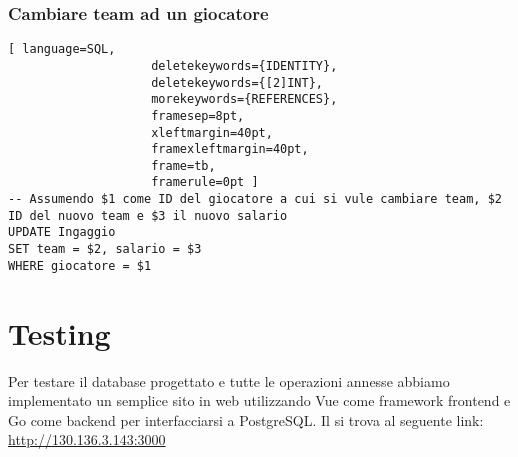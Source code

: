 \documentclass{article}
\begin{document}
\subsubsection{Cambiare team ad un giocatore}
\begin{lstlisting}[ language=SQL,
                    deletekeywords={IDENTITY},
                    deletekeywords={[2]INT},
                    morekeywords={REFERENCES},
                    framesep=8pt,
                    xleftmargin=40pt,
                    framexleftmargin=40pt,
                    frame=tb,
                    framerule=0pt ]
-- Assumendo $1 come ID del giocatore a cui si vule cambiare team, $2 ID del nuovo team e $3 il nuovo salario
UPDATE Ingaggio
SET team = $2, salario = $3
WHERE giocatore = $1
\end{lstlisting}

\section{Testing}
Per testare il database progettato e tutte le operazioni annesse abbiamo implementato un semplice sito in web utilizzando Vue come framework frontend e Go come backend per interfacciarsi a PostgreSQL. Il si trova al seguente link: \url{http://130.136.3.143:3000}
\end{document}
